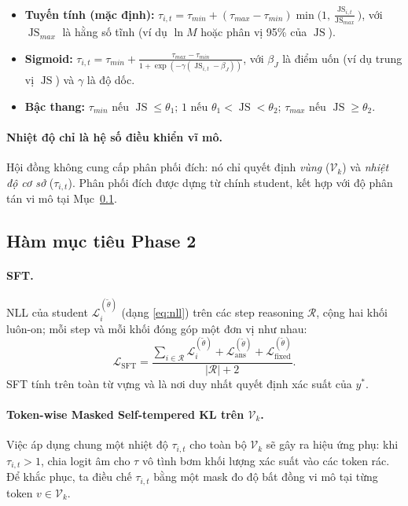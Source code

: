 \documentclass[12pt,a4paper]{article}
\theoremstyle{plain}
\DeclareMathOperator{\JS}{JS}
\newcommand{\Vk}{\mathcal V_k}
\newcommand{\ytar}{y^{*}}
\begin{document}
\begin{itemize}
\item \textbf{Tuyến tính (mặc định):} $\displaystyle\tau_{i,t}=\tau_{min}+(\tau_{max}-\tau_{min})\min\!\Big(1,\frac{\JS_{i,t}}{\JS_{max}}\Big)$, với $\JS_{max}$ là hằng số tĩnh (ví dụ $\ln M$ hoặc phân vị 95\% của $\JS$).
\item \textbf{Sigmoid:} $\displaystyle\tau_{i,t}=\tau_{min}+\frac{\tau_{max}-\tau_{min}}{1+\exp(-\gamma(\JS_{i,t}-\beta_J))}$, với $\beta_J$ là điểm uốn (ví dụ trung vị $\JS$) và $\gamma$ là độ dốc.
\item \textbf{Bậc thang:} $\tau_{min}$ nếu $\JS\le\theta_1$; $1$ nếu $\theta_1<\JS<\theta_2$; $\tau_{max}$ nếu $\JS\ge\theta_2$.
\end{itemize}

\paragraph{Nhiệt độ chỉ là hệ số điều khiển vĩ mô.}
Hội đồng không cung cấp phân phối đích: nó chỉ quyết định \emph{vùng} ($\Vk$) và \emph{nhiệt độ cơ sở} ($\tau_{i,t}$). Phân phối đích được dựng từ chính student, kết hợp với độ phân tán vi mô tại Mục~\ref{sec:phase2loss}.

\subsection{Hàm mục tiêu Phase 2}
\label{sec:phase2loss}

\paragraph{SFT.}
NLL của student $\mathcal L_i^{(\tilde\theta)}$ (dạng \eqref{eq:nll}) trên các step reasoning $\mathcal R$, cộng hai khối luôn-on; mỗi step và mỗi khối đóng góp một đơn vị như nhau:
\begin{equation}
\label{eq:sft_plain}
\mathcal L_{\mathrm{SFT}}=\frac{\sum_{i\in\mathcal R}\mathcal L_i^{(\tilde\theta)}+\mathcal L_{\mathrm{ans}}^{(\tilde\theta)}+\mathcal L_{\mathrm{fixed}}^{(\tilde\theta)}}{|\mathcal R|+2}.
\end{equation}
SFT tính trên toàn từ vựng và là nơi duy nhất quyết định xác suất của $\ytar$.

\paragraph{Token-wise Masked Self-tempered KL trên $\Vk$.}
Việc áp dụng chung một nhiệt độ $\tau_{i,t}$ cho toàn bộ $\Vk$ sẽ gây ra hiệu ứng phụ: khi $\tau_{i,t} > 1$, chia logit âm cho $\tau$ vô tình bơm khối lượng xác suất vào các token rác. Để khắc phục, ta điều chế $\tau_{i,t}$ bằng một mask đo độ bất đồng vi mô tại từng token $v \in \Vk$.
\end{document}
